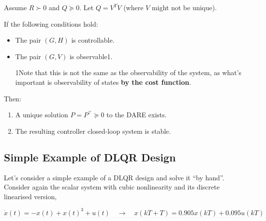 \documentclass[
  letterpaper,
  DIV=11,
  numbers=noendperiod,
  oneside]{scrartcl}
\providecommand{\tightlist}{%
  \setlength{\itemsep}{0pt}\setlength{\parskip}{0pt}}
\begin{document}
\begin{tcolorbox}[enhanced jigsaw, rightrule=.15mm, coltitle=black, titlerule=0mm, breakable, title=\textcolor{quarto-callout-note-color}{\faInfo}\hspace{0.5em}{Theorem: DLQR Stability Theorem}, bottomrule=.15mm, colback=white, toprule=.15mm, opacityback=0, opacitybacktitle=0.6, leftrule=.75mm, left=2mm, colbacktitle=quarto-callout-note-color!10!white, bottomtitle=1mm, toptitle=1mm, arc=.35mm, colframe=quarto-callout-note-color-frame]

Assume \(R \succ 0\) and \(Q \succeq 0\). Let \(Q=V^TV\) (where \(V\)
might not be unique).

If the following conditions hold:

\begin{itemize}
\item
  The pair \((G,H)\) is controllable.
\item
  The pair \((G,V)\) is observable1.

  1Note that this is not the same as the observability of the system, as
  what's important is observability of states \textbf{by the cost
  function}.
\end{itemize}

{Then:}

\begin{enumerate}
\def\labelenumi{\arabic{enumi}.}
\tightlist
\item
  A unique solution \(P=P^\intercal \succeq 0\) to the DARE exists.
\item
  The resulting controller closed-loop system is stable.
\end{enumerate}

\end{tcolorbox}

\subsection{Simple Example of DLQR
Design}\label{simple-example-of-dlqr-design}

Let's consider a simple example of a DLQR design and solve it ``by
hand''. Consider again the scalar system with cubic nonlinearity and its
discrete linearised version,

\[
\dot{x}(t) = -x(t) + x(t)^3 + u(t) \quad \rightarrow \quad x(kT+T) = 0.905x(kT) + 0.095u(kT)
\]
\end{document}
